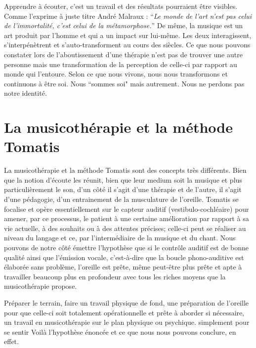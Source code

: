 Apprendre à écouter,
c'est un travail et des résultats pourraient être visibles.
Comme l'exprime à juste titre André Malraux : \enquote{\emph{Le monde de
	l'art n'est pas celui de l'immortalité, c'est celui de la métamorphose.}}
De même, la musique est un art produit par l'homme et qui a un impact
sur lui-même. Les deux interagissent, s'interpénètrent et s'auto-transforment
au cours des siècles.
 Ce que nous pouvons constater lors de l'aboutissement
d'une thérapie n'est pas de trouver une autre personne mais une transformation
de la perception de celle-ci par rapport au monde qui l'entoure. 
Selon
ce que nous vivons, nous nous transformons et continuons à être
soi. Nous ``sommes soi" mais autrement. Nous ne perdons
pas notre identité.

\section{La musicothérapie et la méthode Tomatis}

La musicothérapie et la méthode Tomatis sont des concepts très différents. Bien que la notion d'écoute les réunit, bien que leur medium soit la musique et plus particulièrement le son, d'un côté il s'agit d'une thérapie et de l'autre, il s'agit d'une pédagogie, d'un entrainement de la musculature de l'oreille. 
Tomatis se focalise et opère essentiellement sur le capteur auditif (vestibulo-cochléaire) pour amener, par ce processus, le patient à une certaine  amélioration par rapport à sa vie actuelle, à des souhaits ou à des attentes précises; celle-ci peut se réaliser au niveau du langage et ce, par l'intermédiaire de la musique et du chant. Nous pouvons de notre côté  émettre l'hypothèse que si le contrôle auditif est de bonne qualité ainsi que l'émission vocale, c'est-à-dire que la boucle phono-auditive est élaborée sans problème, l'oreille est prête, même peut-être plus prête et apte à travailler beaucoup plus en profondeur avec tous les riches moyens que la musicothérapie propose.


Préparer le terrain, faire un travail physique de fond, une préparation de l'oreille pour que celle-ci soit totalement opérationnelle et prête à aborder si nécessaire, un travail en musicothérapie sur le plan physique ou psychique. simplement pour se sentir 
Voilà l'hypothèse énoncée et ce que nous nous pouvons conclure, en effet.
